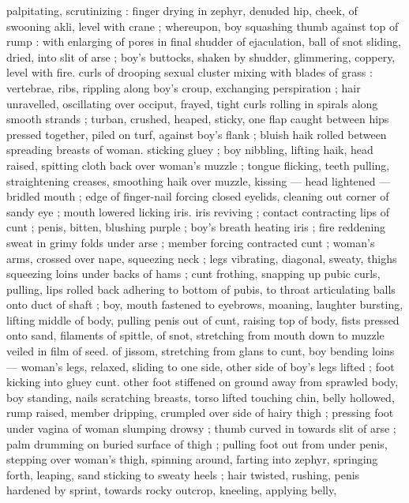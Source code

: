 palpitating, scrutinizing : finger drying in zephyr, denuded hip, 
cheek, of swooning akli, level with crane ; whereupon, boy squashing 
thumb against top of rump : with enlarging of pores in final shudder 
of ejaculation, ball of snot sliding, dried, into slit of arse ; boy's 
buttocks, shaken by shudder, glimmering, coppery, level with fire. 
curls of drooping sexual cluster mixing with blades of grass : 
vertebrae, ribs, rippling along boy's croup, exchanging perspiration 
; hair unravelled, oscillating over occiput, frayed, tight curls rolling in 
spirals along smooth strands ; turban, crushed, heaped, sticky, one 
flap caught between hips pressed together, piled on turf, against 
boy's flank ; bluish haik rolled between spreading breasts of woman. 
sticking gluey ; boy nibbling, lifting haik, head raised, spitting cloth 
back over woman's muzzle ; tongue flicking, teeth pulling, 
straightening creases, smoothing haik over muzzle, kissing --- head 
lightened --- bridled mouth ; edge of finger-nail forcing closed 
eyelids, cleaning out corner of sandy eye ; mouth lowered licking iris. 
iris reviving ; contact contracting lips of cunt ; penis, bitten, blushing 
purple ; boy's breath heating iris ; fire reddening sweat in grimy folds 
under arse ; member forcing contracted cunt ; woman's arms, 
crossed over nape, squeezing neck ; legs vibrating, diagonal, sweaty, 
thighs squeezing loins under backs of hams ; cunt frothing, snapping 
up pubic curls, pulling, lips rolled back adhering to bottom of pubis, 
to throat articulating balls onto duct of shaft ; boy, mouth fastened 
to eyebrows, moaning, laughter bursting, lifting middle of body, 
pulling penis out of cunt, raising top of body, fists pressed onto 
sand, filaments of spittle, of snot, stretching from mouth down to 
muzzle veiled in film of seed. of jissom, stretching from glans to 
cunt, boy bending loins --- woman's legs, relaxed, sliding to one 
side, other side of boy's legs lifted ; foot kicking into gluey cunt. 
other foot stiffened on ground away from sprawled body, boy 
standing, nails scratching breasts, torso lifted touching chin, belly 
hollowed, rump raised, member dripping, crumpled over side of 
hairy thigh ; pressing foot under vagina of woman slumping drowsy 
; thumb curved in towards slit of arse ; palm drumming on buried 
surface of thigh ; pulling foot out from under penis, stepping over 
woman's thigh, spinning around, farting into zephyr, springing forth, 
leaping, sand sticking to sweaty heels ; hair twisted, rushing, penis 
hardened by sprint, towards rocky outcrop, kneeling, applying belly, 
